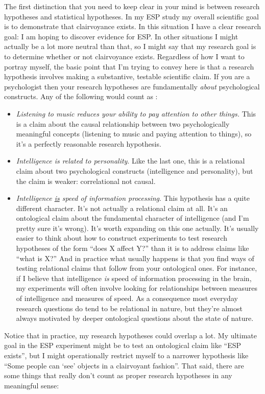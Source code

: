 The first distinction that you need to keep clear in your mind is between  research hypotheses and statistical hypotheses. In my ESP study my overall scientific goal is to demonstrate that clairvoyance exists. In this situation I have a clear research goal: I am hoping to discover evidence for ESP. In other situations I might actually be a lot more neutral than that, so I might say that my research goal is to determine whether or not clairvoyance exists. Regardless of how I want to portray myself, the basic point that I'm trying to convey here is that a research hypothesis involves making a substantive, testable scientific claim. If you are a psychologist then your research hypotheses are fundamentally {\it about} psychological constructs. Any of the following would count as :
\begin{itemize}
\item {\it Listening to music reduces your ability to pay attention to other things.} This is a claim about the causal relationship between two psychologically meaningful concepts (listening to music and paying attention to things), so it's a perfectly reasonable research hypothesis.
\item {\it Intelligence is related to personality}. Like the last one, this is a relational claim about two psychological constructs (intelligence and personality), but the claim is weaker: correlational not causal.
\item {\it Intelligence \underline{is} speed of information processing}. This hypothesis has a quite different character. It's not actually a relational claim at all. It's an ontological claim about the fundamental character of intelligence (and I'm pretty sure it's wrong). It's worth expanding on this one actually. It's usually easier to think about how to construct experiments to test research hypotheses of the form ``does X affect Y?'' than it is to address claims like ``what is X?'' And in practice what usually happens is that you find ways of testing relational claims that follow from your ontological ones. For instance, if I believe that intelligence {\it is} speed of information processing in the brain, my experiments will often involve looking for relationships between measures of intelligence and measures of speed. As a consequence most everyday research questions do tend to be relational in nature, but they're almost always motivated by deeper ontological questions about the state of nature. 
\end{itemize}
Notice that in practice, my research hypotheses could overlap a lot. My ultimate goal in the ESP experiment might be to test an ontological claim like ``ESP exists'', but I might operationally restrict myself to a narrower hypothesis like ``Some people can `see' objects in a clairvoyant fashion''. That said, there are some things that really don't count as proper research hypotheses in any meaningful sense: 
